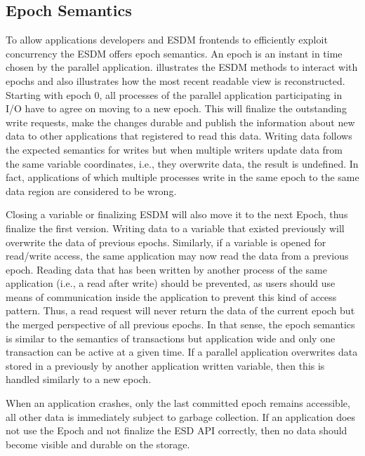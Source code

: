 \subsection{Epoch Semantics}
\label{sec: viewpoints/logical/data model/epochs}

To allow applications developers and ESDM frontends to efficiently exploit concurrency the ESDM offers epoch semantics.
An epoch is an instant in time chosen by the parallel application.
 illustrates the ESDM methods to interact with epochs and also illustrates how the most recent readable view is reconstructed.
Starting with epoch 0, all processes of the parallel application participating in I/O have to agree on moving to a new epoch.
This will finalize the outstanding write requests, make the changes durable and publish the information about new data to other applications that registered to read this data.
Writing data follows the expected semantics for writes but when multiple writers update data from the same variable coordinates, i.e., they overwrite data, the result is undefined.
In fact, applications of which multiple processes write in the same epoch to the same data region are considered to be wrong.

Closing a variable or finalizing ESDM will also move it to the next Epoch, thus finalize the first version.
Writing data to a variable that existed previously will overwrite the data of previous epochs.
Similarly, if a variable is opened for read/write access, the same application may now read the data from a previous epoch.
Reading data that has been written by another process of the same application (i.e., a read after write) should be prevented, as users should use means of communication inside the application to prevent this kind of access pattern.
Thus, a read request will never return the data of the current epoch but the merged perspective of all previous epochs.
In that sense, the epoch semantics is similar to the semantics of transactions but application wide and only one transaction can be active at a given time.
If a parallel application overwrites data stored in a previously by another application written variable, then this is handled similarly to a new epoch.

When an application crashes, only the last committed epoch remains accessible, all other data is immediately subject to garbage collection.
If an application does not use the Epoch and not finalize the ESD API correctly, then no data should become visible and durable on the storage.




